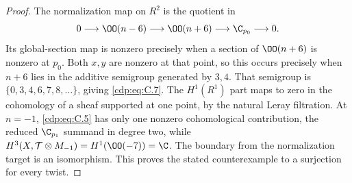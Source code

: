 \begin{proof}
The normalization map on $R^2$ is the quotient in
\[
0\longrightarrow\OO(n-6)\longrightarrow\OO(n+6)
 \longrightarrow\C_{p_0}\longrightarrow0.
\]
Its global-section map is nonzero precisely when a section of $\OO(n+6)$ is nonzero at $p_0$. Both $x,y$ are nonzero at that point, so this occurs precisely when $n+6$ lies in the additive semigroup generated by $3,4$. That semigroup is $\{0,3,4,6,7,8,\ldots\}$, giving \eqref{cdp:eq:C.7}. The $H^1(R^1)$ part maps to zero in the cohomology of a sheaf supported at one point, by the natural Leray filtration. At $n=-1$, \eqref{cdp:eq:C.5} has only one nonzero cohomological contribution, the reduced $\C_{p_1}$ summand in degree two, while $H^3(X,\mathcal T\otimes M_{-1})=H^1(\OO(-7))=\C$. The boundary from the normalization target is an isomorphism. This proves the stated counterexample to a surjection for every twist.
\end{proof}


